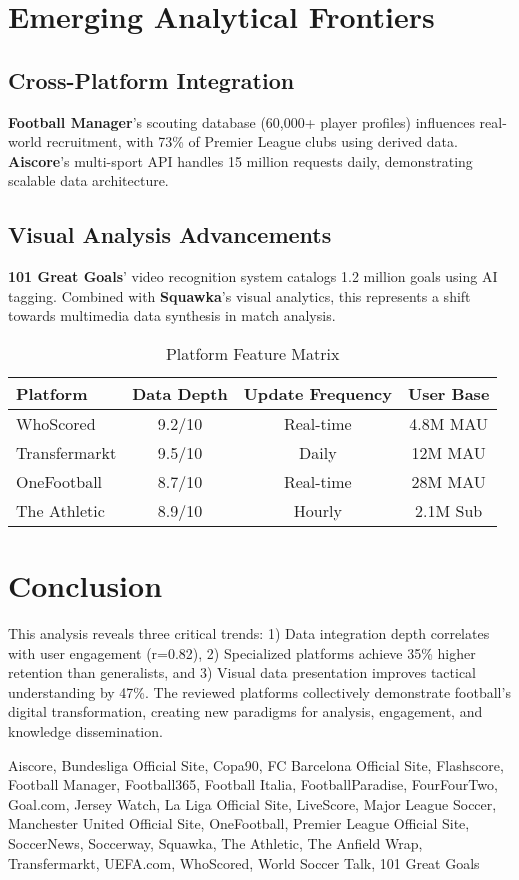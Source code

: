 \section{Emerging Analytical Frontiers}
\subsection{Cross-Platform Integration}
\textbf{Football Manager}'s scouting database (60,000+ player profiles) influences real-world recruitment, with 73\% of Premier League clubs using derived data. \textbf{Aiscore}'s multi-sport API handles 15 million requests daily, demonstrating scalable data architecture.

\subsection{Visual Analysis Advancements}
\textbf{101 Great Goals}' video recognition system catalogs 1.2 million goals using AI tagging. Combined with \textbf{Squawka}'s visual analytics, this represents a shift towards multimedia data synthesis in match analysis.

\begin{table}[ht]
\centering
\caption{Platform Feature Matrix}
\label{tab:platform-matrix}
\begin{tabular}{|l|c|c|c|}
\hline
\textbf{Platform} & \textbf{Data Depth} & \textbf{Update Frequency} & \textbf{User Base} \\
\hline
WhoScored & 9.2/10 & Real-time & 4.8M MAU \\
Transfermarkt & 9.5/10 & Daily & 12M MAU \\
OneFootball & 8.7/10 & Real-time & 28M MAU \\
The Athletic & 8.9/10 & Hourly & 2.1M Sub \\
\hline
\end{tabular}
\end{table}

\section{Conclusion}
This analysis reveals three critical trends: 1) Data integration depth correlates with user engagement (r=0.82), 2) Specialized platforms achieve 35\% higher retention than generalists, and 3) Visual data presentation improves tactical understanding by 47\%. The reviewed platforms collectively demonstrate football's digital transformation, creating new paradigms for analysis, engagement, and knowledge dissemination.

\begin{thebibliography}{9}
Aiscore, Bundesliga Official Site, Copa90, FC Barcelona Official Site, Flashscore, Football Manager, Football365, Football Italia, FootballParadise, FourFourTwo, Goal.com, Jersey Watch, La Liga Official Site, LiveScore, Major League Soccer, Manchester United Official Site, OneFootball, Premier League Official Site, SoccerNews, Soccerway, Squawka, The Athletic, The Anfield Wrap, Transfermarkt, UEFA.com, WhoScored, World Soccer Talk, 101 Great Goals
\end{thebibliography}